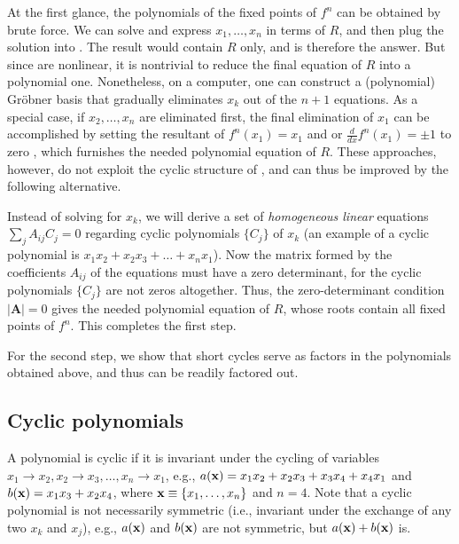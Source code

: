 \documentclass[twocolumn]{revtex4-1}
\begin{document}
At the first glance, the polynomials of the fixed points of $f^n$
  can be obtained by brute force.
We can solve
   and express $x_1, \ldots, x_n$
  in terms of $R$,
  and then plug the solution into .
The result would contain $R$ only,
  and is therefore the answer.
But since  are nonlinear,
  it is nontrivial to reduce the final equation of $R$
  into a polynomial one.
Nonetheless, on a computer, one can
  construct a (polynomial) Gr\"obner basis \cite{kk1}
  that gradually eliminates $x_k$ out of the $n+1$ equations.
As a special case, if $x_2, \dots, x_n$ are eliminated first,
  the final elimination of $x_1$ can be accomplished
  by setting the resultant of $f^n(x_1) = x_1$ and
   or $\frac{d}{dx}f^n (x_1) = \pm 1$
  to zero \cite{burm},
  which furnishes the needed polynomial equation of $R$.
%
These approaches, however, do not
  exploit the cyclic structure of ,
  and can thus be improved by the following alternative.


Instead of solving  for $x_k$,
  we will derive a set of \emph{homogeneous linear} equations
  $\sum_j A_{ij} C_j = 0$
  regarding cyclic polynomials $\{C_j\}$ of $x_k$
  (an example of a cyclic polynomial is $x_1 x_2 + x_2 x_3 + \dots + x_n x_1$).
%
Now the matrix formed by the coefficients $A_{ij}$ of the equations
  must have a zero determinant,
  for the cyclic polynomials $\{C_j\}$ are not zeros altogether.
%
Thus, the zero-determinant condition $|\mathbf A| = 0$ gives
  the needed polynomial equation of $R$,
whose roots contain all fixed points of $f^n$.
This completes the first step.
%
%


For the second step,
we show
that short cycles serve as
factors in the polynomials obtained above,
and thus can be readily factored out.


\subsection{\label{sec:cyclic}Cyclic polynomials}


A polynomial is cyclic if it is invariant
  under the cycling of variables
  $x_1 \rightarrow x_2, x_2 \rightarrow x_3,
  \ldots, x_n \rightarrow x_1$,
  e.g., $a(\mathbf{x}) = x_1 x_2 + x_2 x_3 + x_3 x_4 + x_4 x_1$
  and $b(\mathbf{x}) = x_1 x_3 + x_2 x_4$,
  where $\mathbf{x} \equiv \{x_1, \ldots, x_n\}$ and $n = 4$.
Note that a cyclic polynomial is not necessarily symmetric
  (i.e., invariant under the exchange of any two $x_k$ and $x_{j}$),
  e.g., $a(\mathbf{x})$ and $b(\mathbf{x})$ are not symmetric,
  but $a(\mathbf{x}) + b(\mathbf{x})$ is.
\end{document}
